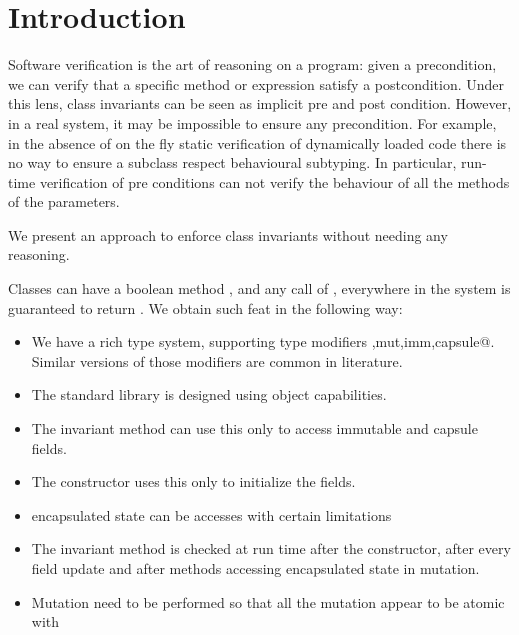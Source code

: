 \section{Introduction}

Software verification is the art of reasoning 
on a program: given a precondition, 
we can verify that a specific method or expression
satisfy a postcondition.
Under this lens, class invariants can be seen as implicit pre and post condition.
However, in a real system, it may be impossible to ensure any precondition. For example, 
in the absence of on the fly static verification of dynamically loaded code there is no way to ensure a
subclass respect behavioural subtyping.
In particular, run-time verification of pre conditions can not verify the behaviour of all the methods of the parameters.

We present an approach to enforce class invariants without needing any reasoning.

Classes can have a boolean method \Q@invariant@,
and any call of \Q@invariant@, everywhere in the system is guaranteed to return \Q@true@.
We obtain such feat in the following way:
\begin{itemize}
\item We have a rich type system, supporting type modifiers \Q@read,mut,imm,capsule@. Similar versions of those modifiers are common in literature.
\item The standard library is designed using object capabilities.
\item The invariant method can use this only to access immutable and capsule fields.
\item The constructor uses this only to initialize the fields.
\item encapsulated state can be accesses with certain limitations
\item The invariant method is checked at run time after the constructor, after every field update and
after methods accessing encapsulated state in mutation.
\item Mutation need to be performed so that all the mutation appear to be atomic with 
\end{itemize}
\LINE


